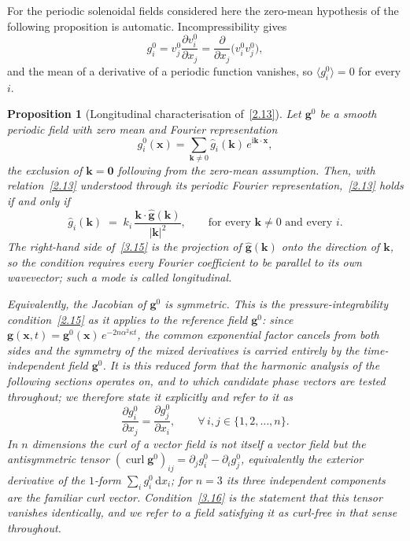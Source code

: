 \documentclass[11pt]{jfm}
\newtheorem{proposition}[lemma]{Proposition}
\numberwithin{equation}{section}
\begin{document}
For the periodic solenoidal fields considered here the zero-mean hypothesis of the following
proposition is automatic. Incompressibility gives
\[
g_i^0 = v_j^0\frac{\partial v_i^0}{\partial x_j}
      = \frac{\partial}{\partial x_j}\bigl(v_i^0 v_j^0\bigr),
\]
and the mean of a derivative of a periodic function vanishes, so
$\langle g_i^0\rangle=0$ for every $i$.

\begin{proposition}[Longitudinal characterisation of~\eqref{2.13}]
\label{prop:longitudinal}
Let $\boldsymbol{g}^0$ be a smooth periodic field with zero mean and Fourier
representation
\begin{equation}
\label{3.14}
g_i^0(\boldsymbol{x})=\sum_{\boldsymbol{k}\neq 0}\widehat{g}_i(\boldsymbol{k})\,
e^{\mathrm{i}\boldsymbol{k}\cdot\boldsymbol{x}},
\end{equation}
the exclusion of $\boldsymbol{k}=\boldsymbol{0}$ following from the zero-mean assumption.
Then, with relation~\eqref{2.13} understood through its periodic Fourier representation,~\eqref{2.13} holds
if and only if
\begin{equation}
\label{3.15}
\widehat{g}_i(\boldsymbol{k})
\;=\;
k_i\,\frac{\boldsymbol{k}\cdot\widehat{\boldsymbol{g}}(\boldsymbol{k})}{|\boldsymbol{k}|^{2}},
\qquad\text{for every }\boldsymbol{k}\neq 0
\text{ and every } i.
\end{equation}
The right-hand side of~\eqref{3.15} is the projection of
$\widehat{\boldsymbol{g}}(\boldsymbol{k})$ onto the direction of $\boldsymbol{k}$, so the
condition requires every Fourier coefficient to be parallel to its own wavevector; such a mode
is called \emph{longitudinal}.

Equivalently, the Jacobian of $\boldsymbol{g}^0$ is symmetric. This is the
pressure-integrability condition~\eqref{2.15} as it applies to the reference field
$\boldsymbol{g}^0$: since $\boldsymbol{g}(\boldsymbol{x},t)=\boldsymbol{g}^0(\boldsymbol{x})\,e^{-2n\alpha^2\kappa t}$,
the common exponential factor cancels from both sides and the symmetry of the
mixed derivatives is carried entirely by the time-independent field $\boldsymbol{g}^0$.
It is this reduced form that the harmonic analysis of the following sections operates on,
and to which candidate phase vectors are tested throughout; we therefore state it explicitly and refer to it as
\begin{equation}
\label{3.16}
\frac{\partial g_i^0}{\partial x_j} = \frac{\partial g_j^0}{\partial x_i},
\qquad \forall\, i, j \in \{1, 2, \dots, n\}.
\end{equation}
In $n$ dimensions the curl of a vector field is not itself a vector field but the antisymmetric
tensor $(\operatorname{curl}\boldsymbol{g}^0)_{ij}=\partial_j g_i^0-\partial_i g_j^0$,
equivalently the exterior derivative of the $1$-form $\sum_i g_i^0\,\mathrm{d}x_i$; for $n=3$
its three independent components are the familiar curl vector. Condition~\eqref{3.16} is the
statement that this tensor vanishes identically, and we refer to a field satisfying it as
\emph{curl-free} in that sense throughout.
\end{proposition}
\end{document}
